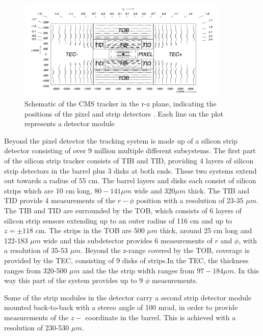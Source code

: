 \begin{figure}[h!]
\begin{center}
\includegraphics[width=0.9\textwidth]{./Detector/Plots/Tracker.png}
\caption{Schematic of the CMS tracker in the r-z plane, indicating the
positions of the pixel and strip detectors \cite{cms-jinst}. Each line 
on the plot represents a detector module}
\label{fig:CMS_tracker}
\end{center}
\end{figure}


Beyond the pixel detector the tracking system is made up of a silicon
strip detector consisting of over 9 million multiple different subsystems. The first part of the
silicon strip tracker consists of \ac{TIB} and \ac{TID}, providing 4 layers of
silicon strip detectors in the barrel plus 3 disks at both ends. These two systems
extend out towards a radius of 55 cm. The barrel layers and disks each consist
of silicon strips which are 10 cm long, $80-141\mu m$ wide and $320 \mu m$ thick. The \ac{TIB} and \ac{TID}
provide 4 measurements of the $r-\phi$ position  with a resolution of 23-35 $\mu m$.
The \ac{TIB} and \ac{TID} are surrounded by the \ac{TOB}, which consists of 6 layers of silicon strip sensors extending
up to an outer radius of 116 cm and up to $z=\pm 118$ cm. The strips in the \ac{TOB} are 500 $\mu m$ thick, around 25 cm long and 122-183 $\mu m$ 
wide and this subdetector provides 6 measurements of $r$ and $\phi$, with a resolution
of 35-53 $\mu m$. Beyond the z-range covered by the \ac{TOB}, coverage is provided by the \ac{TEC},
consisting of 9 disks of strips.In the \ac{TEC}, the thickness ranges from 320-500 $\mu m$ and the the strip width ranges from $97-184 \mu m$.
In this way this part of the system provides up to 9 $\phi$ measurements.

Some of the strip modules in the detector carry a second strip detector module mounted back-to-back with a stereo angle %
of 100 mrad, in order to provide measurements of the $z-$ coordinate in the barrel. This is achieved with a resolution of 230-530 $\mu m$.


